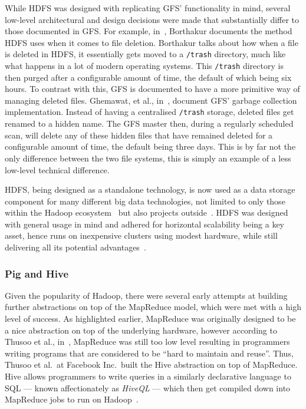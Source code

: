 While HDFS was designed with replicating GFS' functionality in mind, several low-level architectural and design decisions
were made that substantially differ to those documented in GFS. For example, in~\cite{borthakur2007hadoop}, Borthakur
documents the method HDFS uses when it comes to file deletion. Borthakur talks about how when a file is deleted in HDFS,
it essentially gets moved to a \texttt{/trash} directory, much like what happens in a lot of modern operating systems.
This \texttt{/trash} directory is then purged after a configurable amount of time, the default of which being six hours.
To contrast with this, GFS is documented to have a more primitive way of managing deleted files. Ghemawat, et al.,
in~\cite{ghemawat_google_2003}, document GFS' garbage collection implementation. Instead of having a centralised
\texttt{/trash} storage, deleted files get renamed to a hidden name. The GFS master then, during a regularly scheduled
scan, will delete any of these hidden files that have remained deleted for a configurable amount of time, the default
being three days. This is by far not the only difference between the two file systems, this is simply an example of a
less low-level technical difference.

HDFS, being designed as a standalone technology, is now used as a data storage component for many different big data
technologies, not limited to only those within the Hadoop ecosystem~\cite{taylor2010overview} but also projects
outside~\cite{xin2013graphx,yang2013big}. HDFS was designed with general usage in mind and adhered for horizontal
scalability being a key asset, hence runs on inexpensive clusters using modest hardware, while still delivering all
its potential advantages~\cite{borthakur2008hdfs}.



\subsubsection{Pig and Hive} %
\label{ssub:pig_and_hive}

Given the popularity of Hadoop, there were several early attempts at building further abstractions on top of the
MapReduce model, which were met with a high level of success. As highlighted earlier, MapReduce was originally designed
to be a nice abstraction on top of the underlying hardware, however according to Thusoo et al., in~\cite{thusoo2009hive},
MapReduce was still too low level resulting in programmers writing programs that are considered to be ``hard to maintain
and reuse''. Thus, Thusoo et al.\ at Facebook Inc.\ built the Hive abstraction on top of MapReduce. Hive allows
programmers to write queries in a similarly declarative language to SQL --- known affectionately as \textit{HiveQL} ---
which then get compiled down into MapReduce jobs to run on Hadoop~\cite{thusoo2010hive}.

